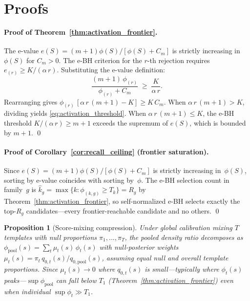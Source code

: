 \documentclass{article}
\newtheorem{proposition}{Proposition}
\theoremstyle{remark}
\newcommand{\1}{\mathbf{1}}
\begin{document}
\section{Proofs}
\label{app:proofs}

\paragraph{Proof of Theorem~\ref{thm:activation_frontier}.}
The e-value $e(S) = (m+1)\phi(S)/[\phi(S) + C_m]$ is strictly increasing
in $\phi(S)$ for $C_m > 0$. The e-BH criterion for the $r$-th rejection
requires $e_{(r)} \ge K/(\alpha\,r)$. Substituting the e-value definition:
\[
\frac{(m+1)\,\phi_{(r)}}{\phi_{(r)} + C_m} \;\ge\; \frac{K}{\alpha\,r}.
\]
Rearranging gives $\phi_{(r)}\,[\alpha\,r\,(m+1) - K] \ge K\,C_m$.
When $\alpha\,r\,(m+1) > K$, dividing yields
\eqref{eq:activation_threshold}. When $\alpha\,r\,(m+1) \le K$, the e-BH
threshold $K/(\alpha\,r) \ge m+1$ exceeds the supremum of $e(S)$, which is
bounded by $m+1$. \qed

\paragraph{Proof of Corollary~\ref{cor:recall_ceiling} (frontier saturation).}
Since $e(S)=(m+1)\phi(S)/[\phi(S)+C_m]$ is strictly increasing in~$\phi(S)$,
sorting by e-value coincides with sorting by~$\phi$. The e-BH selection count
in family~$g$ is $\hat k_g=\max\{k:\phi_{(k,g)}\ge T_k\}=R_g$ by
Theorem~\ref{thm:activation_frontier}, so self-normalized e-BH selects exactly
the top-$R_g$ candidates---every frontier-reachable candidate and no others.
\qed

\begin{proposition}[Score-mixing compression]
\label{prop:mixing_compression}
Under global calibration mixing $T$ templates with null proportions
$\pi_1,\ldots,\pi_T$, the pooled density ratio decomposes as
$\phi_{\mathrm{pool}}(s)=\sum_t \mu_t(s)\,\phi_t(s)$ with
null-posterior weights $\mu_t(s)=\pi_t\,q_{0,t}(s)/q_{0,\mathrm{pool}}(s)$,
assuming equal null and overall template proportions.
Since $\mu_t(s)\!\to\!0$ where $q_{0,t}(s)$ is small---typically where
$\phi_t(s)$ peaks---$\sup\phi_{\mathrm{pool}}$ can fall below
$T_1$ \textup(Theorem~\ref{thm:activation_frontier}\textup) even when
individual $\sup\phi_t\!\gg\!T_1$.
\end{proposition}
\end{document}
